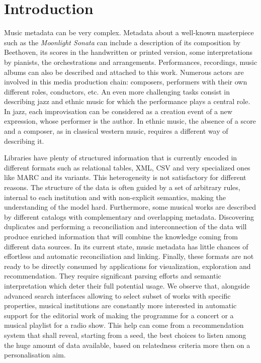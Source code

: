 
\section{Introduction}\label{sec:introduction}
Music metadata can be very complex. Metadata about a well-known masterpiece such as the \textit{Moonlight Sonata} can include a description of its composition by Beethoven, its scores in the handwritten or printed version, some interpretations by pianists, the orchestrations and arrangements. Performances, recordings, music albums can also be described and attached to this work. Numerous actors are involved in this media production chain: composers, performers with their own different roles, conductors, etc. An even more challenging tasks consist in describing jazz and ethnic music for which the performance plays a central role. In jazz, each improvisation can be considered as a creation event of a new expression, whose performer is the author. In ethnic music, the absence of a score and a composer, as in classical western music, requires a different way of describing it.

Libraries have plenty of structured information that is currently encoded in different formats such as relational tables, XML, CSV and very specialized ones like MARC and its variants. This heterogeneity is not satisfactory for different reasons. The structure of the data is often guided by a set of arbitrary rules, internal to each institution and with non-explicit semantics, making the understanding of the model hard. Furthermore, some musical works are described by different catalogs with complementary and overlapping metadata. Discovering duplicates and performing a reconciliation and interconnection of the data will produce enriched information that will combine the knowledge coming from different data sources. In its current state, music metadata has little chances of effortless and automatic reconciliation and linking. Finally, these formats are not ready to be directly consumed by applications for visualization, exploration and recommendation. They require significant parsing efforts and semantic interpretation which deter their full potential usage. We observe that, alongside advanced search interfaces allowing to select subset of works with specific properties, musical institutions are constantly more interested in automatic support for the editorial work of making the programme for a concert or a musical playlist for a radio show. This help can come from a recommendation system that shall reveal, starting from a seed, the best choices to listen among the huge amount of data available, based on relatedness criteria more then on a personalisation aim.

